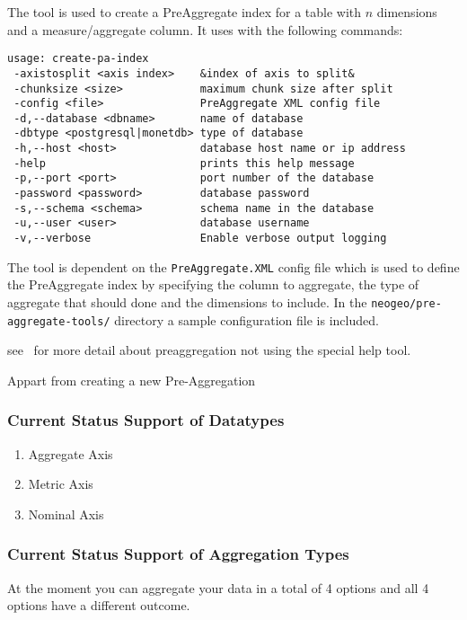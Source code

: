 The tool is used to create a PreAggregate index for a table with $\textit{n}$ dimensions and a measure/aggregate column. It uses with the following commands:
\begin{lstlisting}[basicstyle=\small]
usage: create-pa-index
 -axistosplit <axis index>    &index of axis to split&
 -chunksize <size>            maximum chunk size after split
 -config <file>               PreAggregate XML config file
 -d,--database <dbname>       name of database
 -dbtype <postgresql|monetdb> type of database
 -h,--host <host>             database host name or ip address
 -help                        prints this help message
 -p,--port <port>             port number of the database
 -password <password>         database password
 -s,--schema <schema>         schema name in the database
 -u,--user <user>             database username
 -v,--verbose                 Enable verbose output logging
\end{lstlisting}
The tool is dependent on the \lstinline$PreAggregate.XML$ config file which is used to define the PreAggregate index by specifying the column to aggregate, the type of aggregate that should done and the dimensions to include. In the \lstinline$neogeo/pre-aggregate-tools/$ directory a sample configuration file is included.


see~ for more detail about preaggregation not using the special help tool.

Appart from creating a new Pre-Aggregation 
\subsubsection{Current Status Support of Datatypes}
\begin{enumerate}
	\item Aggregate Axis
	\item Metric Axis
	\item Nominal Axis
\end{enumerate}

\subsubsection{Current Status Support of Aggregation Types}
At the moment you can aggregate your data in a total of 4 options and all 4 options have a different outcome.

